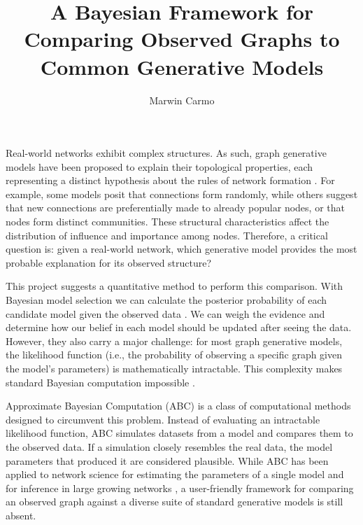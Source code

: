 \documentclass[stu,12pt,floatsintext]{apa7}
\title{A Bayesian Framework for Comparing Observed Graphs to Common Generative Models} %
\author{Marwin Carmo}
\affiliation{University of California, Davis}
\begin{document}
\maketitle %


Real-world networks exhibit complex structures. As such, graph generative models have been proposed to explain their topological properties, each representing a distinct hypothesis about the rules of network formation \parencite{wallis2007}. For example, some models posit that connections form randomly, while others suggest that new connections are preferentially made to already popular nodes, or that nodes form distinct communities. These structural characteristics affect the distribution of influence and importance among nodes. Therefore, a critical question is: given a real-world network, which generative model provides the most probable explanation for its observed structure? 

This project suggests a quantitative method to perform this comparison. With Bayesian model selection we can calculate the posterior probability of each candidate model given the observed data \parencite{rouder2018}. We can weigh the evidence and determine how our belief in each model should be updated after seeing the data. However, they also carry a major challenge: for most graph generative models, the likelihood function (i.e., the probability of observing a specific graph given the model's parameters) is mathematically intractable. This complexity makes standard Bayesian computation impossible \parencite{murray2012mcmc}.

Approximate Bayesian Computation (ABC) is a class of computational methods designed to circumvent this problem. Instead of evaluating an intractable likelihood function, ABC simulates datasets from a model and compares them to the observed data. If a simulation closely resembles the real data, the model parameters that produced it are considered plausible. While ABC has been applied to network science for estimating the parameters of a single model and for inference in large growing networks , a user-friendly framework for comparing an observed graph against a diverse suite of standard generative models is still absent.
\end{document}
